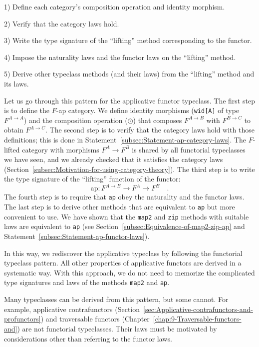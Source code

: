 1) Define each category\textsf{'}s composition operation and identity morphism.

2) Verify that the category laws hold.

3) Write the type signature of the \textsf{``}lifting\textsf{''} method corresponding
to the functor.

4) Impose the naturality laws and the functor laws on the \textsf{``}lifting\textsf{''}
method.

5) Derive other typeclass methods (and their laws) from the \textsf{``}lifting\textsf{''}
method and its laws.

Let us go through this pattern for the applicative functor typeclass.
The first step is to define the $F$-ap  category. We define identity
morphisms (\lstinline!wid[A]! of type $F^{A\rightarrow A}$) and
the composition operation ($\odot$) that composes $F^{A\rightarrow B}$
with $F^{B\rightarrow C}$ to obtain $F^{A\rightarrow C}$. The second
step is to verify that the category laws hold with those definitions;
this is done in Statement~\ref{subsec:Statement-ap-category-laws}.
The $F$-lifted category with morphisms $F^{A}\rightarrow F^{B}$
is shared by all functorial typeclasses we have seen, and we already
checked that it satisfies the category laws (Section~\ref{subsec:Motivation-for-using-category-theory}).
The third step is to write the type signature of the \textsf{``}lifting\textsf{''}
function of the functor:
\[
\text{ap}:F^{A\rightarrow B}\rightarrow F^{A}\rightarrow F^{B}\quad.
\]
The fourth step is to require that \lstinline!ap! obey the naturality
and the functor laws. The last step is to derive other methods that
are equivalent to \lstinline!ap! but more convenient to use. We have
shown that the \lstinline!map2! and \lstinline!zip! methods with
suitable laws are equivalent to \lstinline!ap! (see Section~\ref{subsec:Equivalence-of-map2-zip-ap}
and Statement~\ref{subsec:Statement-ap-functor-laws}). 

In this way, we rediscover the applicative typeclass by following
the functorial typeclass pattern. All other properties of applicative
functors are derived in a systematic way. With this approach, we do
not need to memorize the complicated type signatures and laws of the
methods \lstinline!map2! and \lstinline!ap!.

Many typeclasses can be derived from this pattern, but some cannot.
For example, applicative contrafunctors (Section~\ref{sec:Applicative-contrafunctors-and-profunctors})
and traversable functors (Chapter~\ref{chap:9-Traversable-functors-and})
are not functorial typeclasses. Their laws must be motivated by considerations
other than referring to the functor laws.

